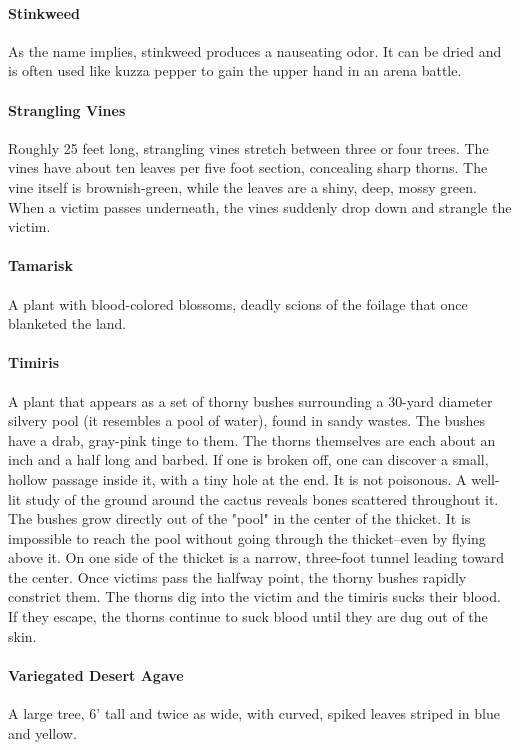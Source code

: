 \begin{multicols}{2}
\paragraph{Stinkweed}
As the name implies, stinkweed produces a nauseating odor. It can be
dried and is often used like kuzza pepper to gain the upper hand in
an arena battle.

\paragraph{Strangling Vines}
Roughly 25 feet long, strangling vines stretch between three or four
trees. The vines have about ten leaves per five foot section, concealing
sharp thorns. The vine itself is brownish-green, while the leaves are
a shiny, deep, mossy green. When a victim passes underneath, the vines
suddenly drop down and strangle the victim.

\paragraph{Tamarisk}
A plant with blood-colored blossoms, deadly scions of the foilage that
once blanketed the land.

\paragraph{Timiris}
A plant that appears as a set of thorny bushes surrounding a 30-yard
diameter silvery pool (it resembles a pool of water), found in sandy
wastes. The bushes have a drab, gray-pink tinge to them. The thorns
themselves are each about an inch and a half long and barbed. If one
is broken off, one can discover a small, hollow passage inside it,
with a tiny hole at the end. It is not poisonous. A well-lit study
of the ground around the cactus reveals bones scattered throughout
it. The bushes grow directly out of the "pool" in the center of the
thicket. It is impossible to reach the pool without going through
the thicket--even by flying above it. On one side of the thicket is
a narrow, three-foot tunnel leading toward the center. Once victims
pass the halfway point, the thorny bushes rapidly constrict them.
The thorns dig into the victim and the timiris sucks their blood.
If they escape, the thorns continue to suck blood until they are
dug out of the skin.

\paragraph{Variegated Desert Agave}
A large tree, 6' tall and twice as wide, with curved, spiked
leaves striped in blue and yellow.


\end{multicols}
